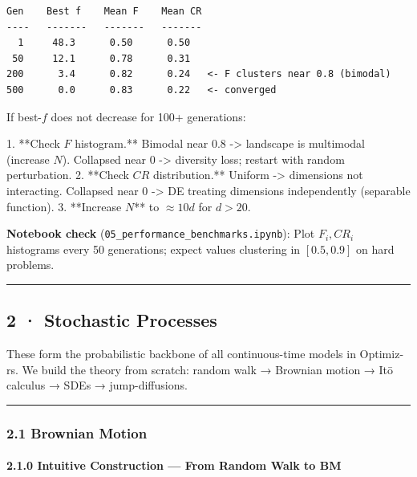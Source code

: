 \documentclass[11pt,a4paper]{article}
\begin{document}
\begin{verbatim}
Gen    Best f    Mean F    Mean CR
----   -------   -------   -------
  1     48.3      0.50      0.50
 50     12.1      0.78      0.31
200      3.4      0.82      0.24   <- F clusters near 0.8 (bimodal)
500      0.0      0.83      0.22   <- converged
\end{verbatim}

\begin{tcolorbox}[colback=thmbg!60,colframe=optgold,fonttitle=\bfseries\sffamily,title={\textsf{\textbf{Theorem / Key Idea}} — Tip — Diagnosing Stagnation},breakable]
If best-$f$ does not decrease for 100+ generations:

1. **Check $F$ histogram.** Bimodal near 0.8 -> landscape is multimodal (increase $N$).
   Collapsed near 0 -> diversity loss; restart with random perturbation.
2. **Check $CR$ distribution.** Uniform -> dimensions not interacting.
   Collapsed near 0 -> DE treating dimensions independently (separable function).
3. **Increase $N$** to $\approx 10d$ for $d > 20$.
\end{tcolorbox}

\textbf{Notebook check} (\texttt{05\_performance\_benchmarks.ipynb}): Plot \(F_i, CR_i\) histograms every 50 generations; expect values clustering in \([0.5,0.9]\) on hard problems.

\begin{center}\rule{0.5\linewidth}{0.5pt}\end{center}

\subsection{2 · Stochastic Processes}\label{stochastic-processes}

These form the probabilistic backbone of all continuous-time models in Optimiz-rs. We build the theory from scratch: random walk → Brownian motion → Itō calculus → SDEs → jump-diffusions.

\begin{center}\rule{0.5\linewidth}{0.5pt}\end{center}

\subsubsection{2.1 Brownian Motion}\label{brownian-motion}

\paragraph{2.1.0 Intuitive Construction --- From Random Walk to BM}\label{intuitive-construction-from-random-walk-to-bm}
\end{document}
